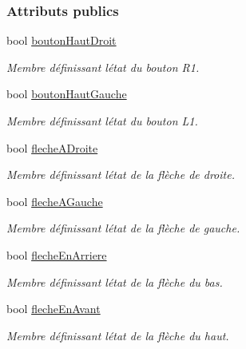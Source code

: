 \subsubsection*{Attributs publics}
\begin{DoxyCompactItemize}
\item 
bool \hyperlink{struct_etat_manette_pilotage_ae0ca75dab8c31fe26d440ec319e2fa84}{bouton\+Haut\+Droit}
\begin{DoxyCompactList}\small\item\em Membre définissant l\textquotesingle{}état du bouton R1. \end{DoxyCompactList}\item 
bool \hyperlink{struct_etat_manette_pilotage_aef8579e406e8766c1936db6da460492a}{bouton\+Haut\+Gauche}
\begin{DoxyCompactList}\small\item\em Membre définissant l\textquotesingle{}état du bouton L1. \end{DoxyCompactList}\item 
bool \hyperlink{struct_etat_manette_pilotage_a78a791f6f8968042efd8e2f64f70f882}{fleche\+A\+Droite}
\begin{DoxyCompactList}\small\item\em Membre définissant l\textquotesingle{}état de la flèche de droite. \end{DoxyCompactList}\item 
bool \hyperlink{struct_etat_manette_pilotage_aace02b9bb3feb3b618dd9133d4c5b87f}{fleche\+A\+Gauche}
\begin{DoxyCompactList}\small\item\em Membre définissant l\textquotesingle{}état de la flèche de gauche. \end{DoxyCompactList}\item 
bool \hyperlink{struct_etat_manette_pilotage_ab7cce4480358d2e7ac189e96ab04b894}{fleche\+En\+Arriere}
\begin{DoxyCompactList}\small\item\em Membre définissant l\textquotesingle{}état de la flèche du bas. \end{DoxyCompactList}\item 
bool \hyperlink{struct_etat_manette_pilotage_a12429b457b51cb45cc9d405f3a01bea6}{fleche\+En\+Avant}
\begin{DoxyCompactList}\small\item\em Membre définissant l\textquotesingle{}état de la flèche du haut. \end{DoxyCompactList}\end{DoxyCompactItemize}


